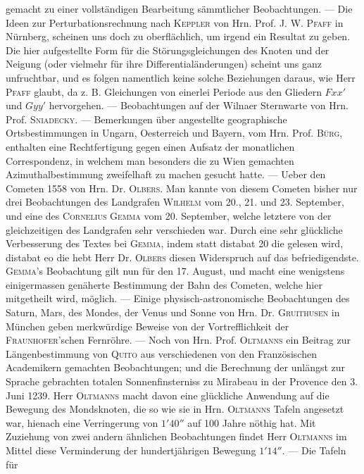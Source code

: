 gemacht zu einer vollständigen Bearbeitung sämmtlicher Beobachtungen. --- Die Ideen zur Perturbationsrechnung nach \textsc{Keppler} von Hrn. Prof. J. W. \textsc{Pfaff} in Nürnberg, scheinen uns doch zu oberflächlich, um irgend ein Resultat zu geben. Die hier aufgestellte Form für die Störungsgleichungen des Knoten und der Neigung (oder vielmehr für ihre Differentialänderungen) scheint uns ganz unfruchtbar, und es folgen namentlich keine solche Beziehungen daraus, wie Herr \textsc{Pfaff} glaubt, da z. B. Gleichungen von einerlei Periode aus den Gliedern $Fxx'$ und $Gyy'$ hervorgehen. --- Beobachtungen auf der Wilnaer Sternwarte von Hrn. Prof. \textsc{Sniadecky}. --- Bemerkungen über angestellte geographische Ortsbestimmungen in Ungarn, Oesterreich und Bayern, vom Hrn. Prof. \textsc{Bürg}, enthalten eine Rechtfertigung gegen einen Aufsatz der monatlichen Correspondenz, in welchem man besonders die zu Wien gemachten Azimuthalbestimmung zweifelhaft zu machen gesucht hatte. --- Ueber den Cometen 1558 von Hrn. Dr. \textsc{Olbers}. Man kannte von diesem Cometen bisher nur drei Beobachtungen des Landgrafen \textsc{Wilhelm} vom 20., 21. und 23. September, und eine des \textsc{Cornelius Gemma} vom 20. September, welche letztere von
der gleichzeitigen des Landgrafen sehr verschieden war. Durch eine sehr glückliche Verbesserung des
Textes bei \textsc{Gemma}, indem statt distabat 20 die gelesen wird, distabat eo die hebt Herr Dr. \textsc{Olbers} diesen Widerspruch auf das befriedigendste. \textsc{Gemma}'s Beobachtung gilt nun für den 17. August, und macht
eine wenigstens einigermassen genäherte Bestimmung der Bahn des Cometen, welche hier mitgetheilt
wird, möglich. --- Einige physisch-astronomische Beobachtungen des Saturn, Mars, des Mondes, der
Venus und Sonne von Hrn. Dr. \textsc{Gruithusen} in München geben merkwürdige Beweise von der Vortrefflichkeit der \textsc{Fraunhofer}'schen Fernröhre. --- Noch von Hrn. Prof. \textsc{Oltmanns} ein Beitrag zur Längenbestimmung von \textsc{Quito} aus verschiedenen von den Französischen Academikern gemachten Beobachtungen;
und die Berechnung der unlängst zur Sprache gebrachten totalen Sonnenfinsterniss zu Mirabeau in der
Provence den 3. Juni 1239. Herr \textsc{Oltmanns} macht davon eine glückliche Anwendung auf die Bewegung
des Mondsknoten, die so wie sie in Hrn. \textsc{Oltmanns} Tafeln angesetzt war, hienach eine Verringerung
von $1'40''$ auf 100 Jahre nöthig hat. Mit Zuziehung von zwei andern ähnlichen Beobachtungen findet
Herr \textsc{Oltmanns} im Mittel diese Verminderung der hundertjährigen Bewegung $1'14''$. --- Die Tafeln für
